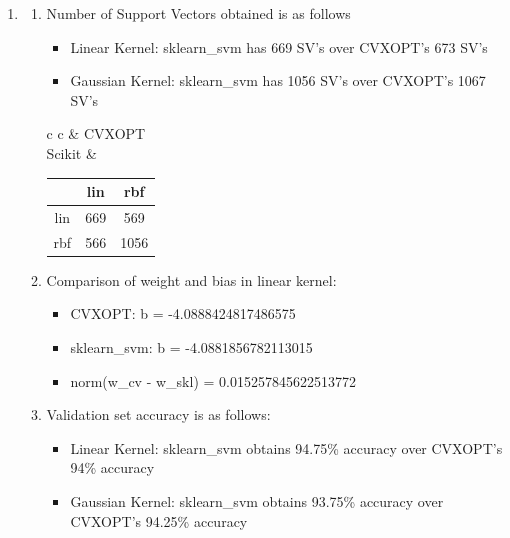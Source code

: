 \begin{enumerate}[label=(\alph*)]
    \item \begin{enumerate}[label=\roman*.]
        \item Number of Support Vectors obtained is as follows
        \begin{itemize}
            \item Linear Kernel: sklearn\_svm has 669 SV's over CVXOPT's 673 SV's
            \item Gaussian Kernel: sklearn\_svm has 1056 SV's over CVXOPT's 1067 SV's
        \end{itemize}
        \begin{center}
            \begin{tabular}{c c}
                & CVXOPT \\
                Scikit & 
            \begin{tabular}{c|c|c|}
                    & lin  & rbf  \\   
                \hline
                lin & 669 & 569 \\
                \hline
                rbf & 566 & 1056 \\
                \hline
            \end{tabular}
            \end{tabular}
        \end{center}

    \item Comparison of weight and bias in linear kernel:
    \begin{itemize}
        \item CVXOPT: b = -4.0888424817486575
        \item sklearn\_svm: b = -4.0881856782113015
        \item norm(w\_cv - w\_skl) = 0.015257845622513772
    \end{itemize}
    \item Validation set accuracy is as follows:
    \begin{itemize}
        \item Linear Kernel: sklearn\_svm obtains 94.75\% accuracy over CVXOPT's 94\% accuracy
        \item Gaussian Kernel: sklearn\_svm obtains 93.75\% accuracy over CVXOPT's 94.25\% accuracy
    \end{itemize}


\end{enumerate}
\end{enumerate}
